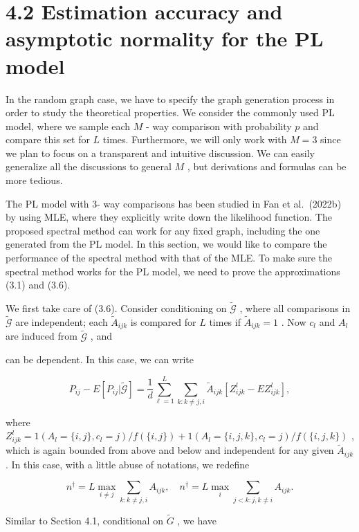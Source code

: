\section{4.2 Estimation accuracy and asymptotic normality for the PL
model}\label{estimation-accuracy-and-asymptotic-normality-for-the-pl-model}

In the random graph case, we have to specify the graph generation
process in order to study the theoretical properties. We consider the
commonly used PL model, where we sample each \(M\) - way comparison with
probability \(p\) and compare this set for \(L\) times. Furthermore, we
will only work with \(M = 3\) since we plan to focus on a transparent
and intuitive discussion. We can easily generalize all the discussions
to general \(M\) , but derivations and formulas can be more tedious.

The PL model with 3- way comparisons has been studied in Fan et
al.~(2022b) by using MLE, where they explicitly write down the
likelihood function. The proposed spectral method can work for any fixed
graph, including the one generated from the PL model. In this section,
we would like to compare the performance of the spectral method with
that of the MLE. To make sure the spectral method works for the PL
model, we need to prove the approximations (3.1) and (3.6).

We first take care of (3.6). Consider conditioning on
\(\widetilde{\mathcal{G}}\) , where all comparisons in
\(\widetilde{\mathcal{G}}\) are independent; each
\(\widetilde{A}_{ijk}\) is compared for \(L\) times if
\(\widetilde{A}_{ijk} = 1\) . Now \(c_{l}\) and \(A_{l}\) are induced
from \(\widetilde{\mathcal{G}}\) , and

can be dependent. In this case, we can write

\[
P_{ij} - E[P_{ij}|\widetilde{\mathcal{G}} ] = \frac{1}{d}\sum_{\ell = 1}^{L}\sum_{k:k\neq j,i}\widetilde{A}_{ijk}[Z_{ijk}^{l} - EZ_{ijk}^{l}],
\]

where
\(Z_{ijk}^{l} = 1(A_{l} = \{i,j\} ,c_{l} = j) / f(\{i,j\}) + 1(A_{l} = \{i,j,k\} ,c_{l} = j) / f(\{i,j,k\})\)
, which is again bounded from above and below and independent for any
given \(\widetilde{A}_{ijk}\) . In this case, with a little abuse of
notations, we redefine

\[
n^{\dagger} = L\max_{i\neq j}\sum_{k:k\neq j,i}A_{ijk},\quad n^{\dagger} = L\max_{i}\sum_{j< k:j,k\neq i}A_{ijk}.
\]

Similar to Section 4.1, conditional on \(\widetilde{G}\) , we have


